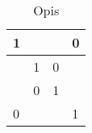 \begin{table} [!h]
\centering
\begin{tabular}{|l|l|l|l|}
\hline
1 &   &   & 0 \\ \hline
  & 1 & 0 &   \\ \hline
  & 0 & 1 &   \\ \hline
0 &   &   & 1 \\ \hline
\end{tabular}
\label{tab:table2}
\caption{Opis}
\end{table}